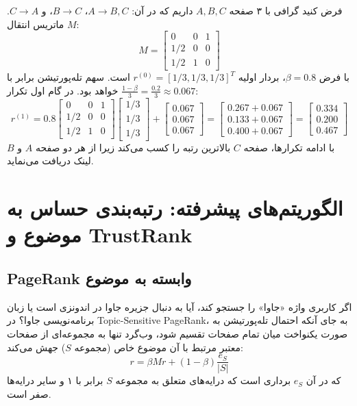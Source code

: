 \begin{example}
فرض کنید گرافی با ۳ صفحه $A, B, C$ داریم که در آن:
$A \to B, C$، $B \to C$، و $C \to A$.
ماتریس انتقال $M$:
\begin{equation}
M = 
\begin{bmatrix}
0 & 0 & 1 \\
1/2 & 0 & 0 \\
1/2 & 1 & 0
\end{bmatrix}
\end{equation}
با فرض $\beta = 0.8$، بردار اولیه $r^{(0)} = [1/3, 1/3, 1/3]^T$ است. سهم تله‌پورتیشن برابر با $\frac{1-\beta}{3} = \frac{0.2}{3} \approx 0.067$ خواهد بود.
در گام اول تکرار:
\begin{equation}
r^{(1)} = 0.8 \begin{bmatrix} 0 & 0 & 1 \\ 1/2 & 0 & 0 \\ 1/2 & 1 & 0 \end{bmatrix} \begin{bmatrix} 1/3 \\ 1/3 \\ 1/3 \end{bmatrix} + \begin{bmatrix} 0.067 \\ 0.067 \\ 0.067 \end{bmatrix} = \begin{bmatrix} 0.267 + 0.067 \\ 0.133 + 0.067 \\ 0.400 + 0.067 \end{bmatrix} = \begin{bmatrix} 0.334 \\ 0.200 \\ 0.467 \end{bmatrix}
\end{equation}
با ادامه تکرارها، صفحه $C$ بالاترین رتبه را کسب می‌کند زیرا از هر دو صفحه $A$ و $B$ لینک دریافت می‌نماید.
\end{example}

\section{الگوریتم‌های پیشرفته: رتبه‌بندی حساس به موضوع و TrustRank}

\subsection{PageRank وابسته به موضوع \texorpdfstring{}{(Topic-Sensitive PageRank)}}
اگر کاربری واژه «جاوا» را جستجو کند، آیا به دنبال جزیره جاوا در اندونزی است یا زبان برنامه‌نویسی جاوا؟
در Topic-Sensitive PageRank، به جای آنکه احتمال تله‌پورتیشن به صورت یکنواخت میان تمام صفحات تقسیم شود، وب‌گرد تنها به مجموعه‌ای از صفحات معتبر مرتبط با آن موضوع خاص (مجموعه $S$) جهش می‌کند:
\begin{equation}
r = \beta M r + (1 - \beta) \frac{e_S}{|S|}
\end{equation}
که در آن $e_S$ برداری است که درایه‌های متعلق به مجموعه $S$ برابر با ۱ و سایر درایه‌ها صفر است.

